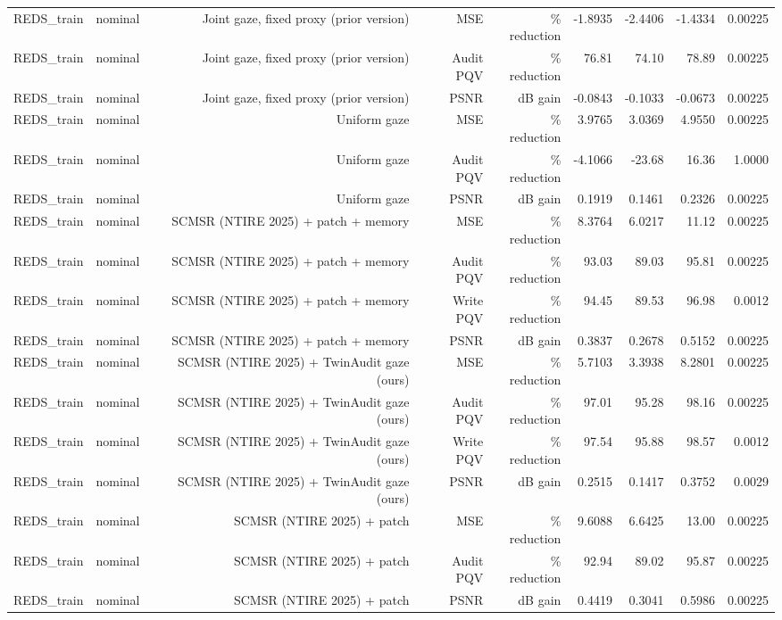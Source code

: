 \begin{table}[t]
\begin{tabular}{llrrrrrrr}
REDS\_train & nominal & Joint gaze, fixed proxy (prior version) & MSE & \% reduction & -1.8935 & -2.4406 & -1.4334 & 0.00225 \\
REDS\_train & nominal & Joint gaze, fixed proxy (prior version) & Audit PQV & \% reduction & 76.81 & 74.10 & 78.89 & 0.00225 \\
REDS\_train & nominal & Joint gaze, fixed proxy (prior version) & PSNR & dB gain & -0.0843 & -0.1033 & -0.0673 & 0.00225 \\
REDS\_train & nominal & Uniform gaze & MSE & \% reduction & 3.9765 & 3.0369 & 4.9550 & 0.00225 \\
REDS\_train & nominal & Uniform gaze & Audit PQV & \% reduction & -4.1066 & -23.68 & 16.36 & 1.0000 \\
REDS\_train & nominal & Uniform gaze & PSNR & dB gain & 0.1919 & 0.1461 & 0.2326 & 0.00225 \\
REDS\_train & nominal & SCMSR (NTIRE 2025) + patch + memory & MSE & \% reduction & 8.3764 & 6.0217 & 11.12 & 0.00225 \\
REDS\_train & nominal & SCMSR (NTIRE 2025) + patch + memory & Audit PQV & \% reduction & 93.03 & 89.03 & 95.81 & 0.00225 \\
REDS\_train & nominal & SCMSR (NTIRE 2025) + patch + memory & Write PQV & \% reduction & 94.45 & 89.53 & 96.98 & 0.0012 \\
REDS\_train & nominal & SCMSR (NTIRE 2025) + patch + memory & PSNR & dB gain & 0.3837 & 0.2678 & 0.5152 & 0.00225 \\
REDS\_train & nominal & SCMSR (NTIRE 2025) + TwinAudit gaze (ours) & MSE & \% reduction & 5.7103 & 3.3938 & 8.2801 & 0.00225 \\
REDS\_train & nominal & SCMSR (NTIRE 2025) + TwinAudit gaze (ours) & Audit PQV & \% reduction & 97.01 & 95.28 & 98.16 & 0.00225 \\
REDS\_train & nominal & SCMSR (NTIRE 2025) + TwinAudit gaze (ours) & Write PQV & \% reduction & 97.54 & 95.88 & 98.57 & 0.0012 \\
REDS\_train & nominal & SCMSR (NTIRE 2025) + TwinAudit gaze (ours) & PSNR & dB gain & 0.2515 & 0.1417 & 0.3752 & 0.0029 \\
REDS\_train & nominal & SCMSR (NTIRE 2025) + patch & MSE & \% reduction & 9.6088 & 6.6425 & 13.00 & 0.00225 \\
REDS\_train & nominal & SCMSR (NTIRE 2025) + patch & Audit PQV & \% reduction & 92.94 & 89.02 & 95.87 & 0.00225 \\
REDS\_train & nominal & SCMSR (NTIRE 2025) + patch & PSNR & dB gain & 0.4419 & 0.3041 & 0.5986 & 0.00225 \\

\end{tabular}
\end{table}
